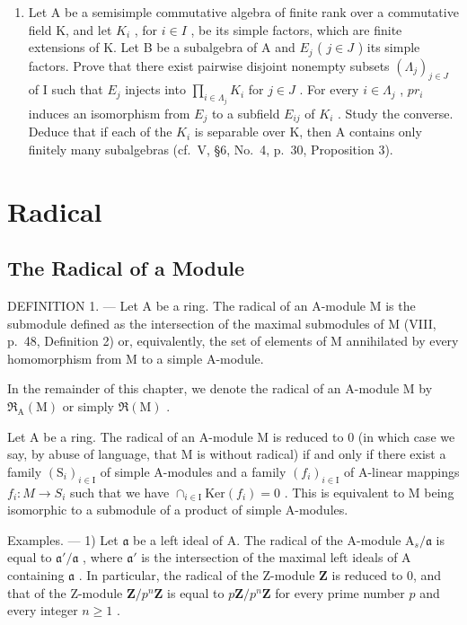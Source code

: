 \begin{enumerate}
\def\labelenumi{\arabic{enumi})}
\setcounter{enumi}{5}
\tightlist
\item
  Let A be a semisimple commutative algebra of finite rank over a commutative field K, and let \(K_{i}\) , for \(i \in I\) , be its simple factors, which are finite extensions of K. Let B be a subalgebra of A and \(E_{j}\) ( \(j \in J\) ) its simple factors. Prove that there exist pairwise disjoint nonempty subsets \((\Lambda_{j})_{j \in J}\) of I such that \(E_{j}\) injects into \(\prod_{i \in \Lambda_{j}} K_{i}\) for \(j \in J\) . For every \(i \in \Lambda_{j}\) , \(pr_{i}\) induces an isomorphism from \(E_{j}\) to a subfield \(E_{ij}\) of \(K_{i}\) . Study the converse. Deduce that if each of the \(K_{i}\) is separable over K, then A contains only finitely many subalgebras (cf.~V, §6, No.~4, p.~30, Proposition 3).
\end{enumerate}

\section{Radical}

\subsection{The Radical of a Module}

DEFINITION 1. --- Let A be a ring. The radical of an A-module M is the submodule defined as the intersection of the maximal submodules of M (VIII, p.~48, Definition 2) or, equivalently, the set of elements of M annihilated by every homomorphism from M to a simple A-module.

In the remainder of this chapter, we denote the radical of an A-module M by \(\mathfrak{R}_{\mathrm{A}}(\mathrm{M})\) or simply \(\mathfrak{R}(\mathrm{M})\) .

Let A be a ring. The radical of an A-module M is reduced to 0 (in which case we say, by abuse of language, that M is without radical) if and only if there exist a family \((\mathrm{S}_{i})_{i\in\mathrm{I}}\) of simple A-modules and a family \((f_{i})_{i\in\mathrm{I}}\) of A-linear mappings \(f_{i}:M\to S_{i}\) such that we have \(\cap_{i\in\mathrm{I}}\mathrm{Ker}(f_{i})=0\) . This is equivalent to M being isomorphic to a submodule of a product of simple A-modules.

Examples. --- 1) Let \(\mathfrak{a}\) be a left ideal of A. The radical of the A-module \(\mathrm{A}_s / \mathfrak{a}\) is equal to \(\mathfrak{a}' / \mathfrak{a}\) , where \(\mathfrak{a}'\) is the intersection of the maximal left ideals of A containing \(\mathfrak{a}\) . In particular, the radical of the Z-module \(\mathbf{Z}\) is reduced to 0, and that of the Z-module \(\mathbf{Z} / p^n\mathbf{Z}\) is equal to \(p\mathbf{Z} / p^n\mathbf{Z}\) for every prime number \(p\) and every integer \(n \geqslant 1\) .

